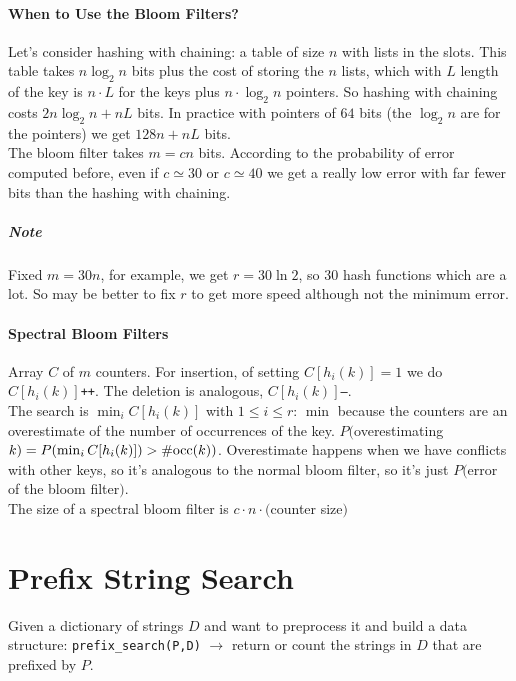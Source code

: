 \documentclass[10pt]{report}
\begin{document}
\paragraph{When to Use the Bloom Filters?} Let's consider hashing with chaining: a table of size $n$ with lists in the slots. This table takes $n\log_2 n$ bits plus the cost of storing the $n$ lists, which with $L$ length of the key is $n\cdot L$ for the keys plus $n\cdot \log_2 n$ pointers. So hashing with chaining costs $2n\log_2n + nL$ bits. In practice with pointers of $64$ bits (the $\log_2 n$ are for the pointers) we get $128n+nL$ bits.\\
The bloom filter takes $m=cn$ bits. According to the probability of error computed before, even if $c\simeq 30$ or $c\simeq 40$ we get a really low error with far fewer bits than the hashing with chaining.
\subparagraph{Note} Fixed $m=30n$, for example, we get $r=30\ln 2$, so $30$ hash functions which are a lot. So may be better to fix $r$ to get more speed although not the minimum error.
\paragraph{Spectral Bloom Filters} Array $C$ of $m$ counters. For insertion, of setting $C[h_i(k)] = 1$ we do $C[h_i(k)]$\texttt{++}. The deletion is analogous, $C[h_i(k)]$\texttt{--}.\\
The search is $\min_i C[h_i(k)]$ with $1\leq i\leq r$: $\min$ because the counters are an overestimate of the number of occurrences of the key. $P($overestimating $k)=P(\min_i C[h_i(k)])>\#\hbox{occ}(k))$. Overestimate happens when we have conflicts with other keys, so it's analogous to the normal bloom filter, so it's just $P($error of the bloom filter$)$.\\
The size of a spectral bloom filter is $c\cdot n\cdot($counter size$)$
\section{Prefix String Search}
Given a dictionary of strings $D$ and want to preprocess it and build a data structure: \texttt{prefix\_search(P,D)} $\rightarrow$ return or count the strings in $D$ that are prefixed by $P$.
\end{document}
